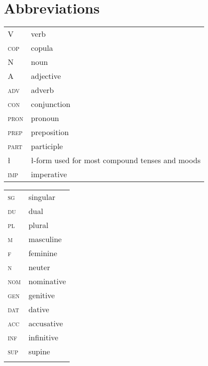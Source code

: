 \documentclass[output=paper,hidelinks]{langscibook}
\begin{document}
\section*{Abbreviations}
\begin{tabularx}{.45\textwidth}{lQ}
V & verb\\
 \textsc{cop} & copula\\
 N & noun\\
 A & adjective\\
 \textsc{adv} & adverb\\
 \textsc{con} & conjunction\\
 \textsc{pron} & pronoun\\
 \textsc{prep} & preposition\\
 \textsc{part} & participle\\
 ł & ł-form used for most compound tenses and moods\\
 \textsc{imp} & imperative\\
 \end{tabularx}
\begin{tabularx}{.45\textwidth}{lQ}
 \textsc{sg} & singular\\
 \textsc{du} & dual \\
 \textsc{pl} & plural\\
 \textsc{m} & masculine\\
 \textsc{f} & feminine\\
 \textsc{n} & neuter\\
 \textsc{nom} & nominative\\
 \textsc{gen} & genitive\\
 \textsc{dat} & dative\\
 \textsc{acc} & accusative\\
 \textsc{inf} & infinitive\\
 \textsc{sup} & supine\\
 \\
\end{tabularx}

\sloppy\printbibliography[heading=subbibliography,notkeyword=this]
\end{document}

